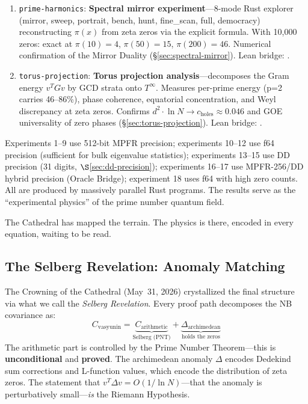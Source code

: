 \documentclass[11pt,a4paper]{article}
\begin{document}
\begin{enumerate}
    Lean bridge: .
  \item \texttt{prime-harmonics}: \textbf{Spectral mirror experiment}---8-mode
    Rust explorer (mirror, sweep, portrait, bench, hunt, fine\_scan, full,
    democracy) reconstructing $\pi(x)$ from zeta zeros via the explicit formula.
    With 10{,}000 zeros: exact at $\pi(10) = 4$, $\pi(50) = 15$,
    $\pi(200) = 46$. Numerical confirmation of the Mirror Duality
    (\S\ref{sec:spectral-mirror}). Lean bridge: .
  \item \texttt{torus-projection}: \textbf{Torus projection analysis}---decomposes
    the Gram energy $v^T G v$ by GCD strata onto $T^\infty$. Measures
    per-prime energy (p=2 carries 46--86\%), phase coherence, equatorial
    concentration, and Weyl discrepancy at zeta zeros. Confirms
    $d^2 \cdot \ln N \to c_{\mathrm{holes}} \approx 0.046$ and
    GOE universality of zero phases (\S\ref{sec:torus-projection}).
    Lean bridge: .
\end{enumerate}
Experiments 1--9 use 512-bit MPFR precision; experiments 10--12 use
f64 precision (sufficient for bulk eigenvalue statistics);
experiments 13--15 use DD precision (31 digits, $\S$\ref{sec:dd-precision});
experiments 16--17 use MPFR-256/DD hybrid precision (Oracle Bridge);
experiment 18 uses f64 with high zero counts.
All are produced by massively parallel Rust programs.
The results serve as the ``experimental physics'' of the prime number
quantum field.

The Cathedral has mapped the terrain. The physics is there,
encoded in every equation, waiting to be read.

\subsection{The Selberg Revelation: Anomaly Matching}
\label{sec:selberg-revelation-inline}

The Crowning of the Cathedral (May~31, 2026) crystallized the
final structure via what we call the \emph{Selberg Revelation}.
Every proof path decomposes the NB covariance as:
\[
  C_{\mathrm{vasyunin}} = \underbrace{C_{\mathrm{arithmetic}}}_{\text{Selberg (PNT)}}
  + \underbrace{\Delta_{\mathrm{archimedean}}}_{\text{holds the zeros}}
\]
The arithmetic part is controlled by the Prime Number Theorem---this is
\textbf{unconditional} and \textbf{proved}. The archimedean anomaly
$\Delta$ encodes Dedekind sum corrections and L-function values, which
encode the distribution of zeta zeros. The statement that
$v^T \Delta v = O(1/\ln N)$---that the anomaly is perturbatively
small---\emph{is} the Riemann Hypothesis.
\end{document}
